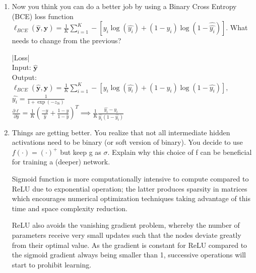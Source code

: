 \documentclass{article}
\begin{document}
\begin{enumerate}
  \item Now you think you can do a better job by using a Binary Cross Entropy
        (BCE) loss function
        $\ell_{BCE}(\bm{\hat{y},y})=\frac{1}{K}\sum_{i=1}^{K}-[y_i\log(\hat{y_i})+(1-y_i)\log(1-\hat{\hat{y_i}})]$.
        What needs to change from the previous?
        \begin{tcolorbox}
          |Loss|\\
          Input: $\bm{\hat{y}}$\\
          Output:
          $\ell_{BCE}(\bm{\hat{y},y})=\frac{1}{K}\sum_{i=1}^{K}-[y_i\log(\hat{y_i})+(1-y_i)\log(1-\hat{y_i})],$\\
          $\hat{y_i}=\frac{1}{1+\exp(-z_{3i})}$\\
          $\frac{\partial \ell}{\partial
              \hat{y}}=\frac{1}{K}(\frac{-y}{\hat{y}}+\frac{1-y}{1-\hat{y}})^T\implies \frac{1}{K}\frac{\hat{y_i}-y_i}{\hat{y_i}(1-\hat{y_i})}$ 
        \end{tcolorbox}
  \item Things are getting better. You realize that not all intermediate hidden
        activations need to be binary (or soft version of binary). You decide to use
        $f(\cdot)=(\cdot)^{+}$ but keep g as $\sigma$. Explain why this choice of f can
        be beneficial for training a (deeper) network.
        \begin{tcolorbox}
          Sigmoid function is more computationally intensive to compute compared
          to ReLU due to exponential operation; the latter produces sparsity in matrices
          which encourages numerical optimization techniques taking advantage of this
          time and space complexity reduction.
        \end{tcolorbox}
        \begin{tcolorbox}
          ReLU also avoids the vanishing gradient problem, whereby the number of
          parameters receive very small updates such that the nodes deviate greatly from
          their optimal value. As the gradient is constant for ReLU compared to the
          sigmoid gradient always being smaller than 1, successive operations will start
          to prohibit learning.
        \end{tcolorbox}
\end{enumerate}
\end{document}
